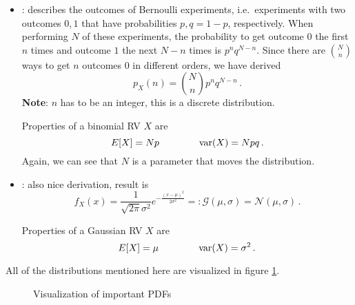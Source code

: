 \begin{ex}
\begin{itemize}
\item {}: describes the outcomes of Bernoulli experiments, i.e.~experiments with two outcomes $0, 1$ that have probabilities $p, q = 1 - p$, respectively. When performing $N$ of these experiments, the probability to get outcome $0$ the first $n$ times and outcome $1$ the next $N - n$ times is $p^n q^{N - n}$. Since there are $\binom{N}{n}$ ways to get $n$ outcomes $0$ in different orders, we have derived
\begin{equation}
p_X(n) = \binom{N}{n} p^n q^{N - n} \, .
\end{equation}
\textbf{Note}: $n$ has to be an integer, this is a discrete distribution.

Properties of a binomial RV $X$ are
\begin{equation}
E[X] = N p \qquad \qquad \operatorname{var}(X) = N p q \, .
\end{equation}
Again, we can see that $N$ is a parameter that moves the distribution.


\item {}: also nice derivation, result is
\begin{equation}
f_X(x) = \frac{1}{\sqrt{2 \pi} \sigma^2} e^{- \frac{(x - \mu)^2}{2 \sigma^2}} =: \mathcal{G}(\mu, \sigma) = \mathcal{N}(\mu, \sigma) \, .
\end{equation}

Properties of a Gaussian RV $X$ are
\begin{equation}
E[X] = \mu \qquad \qquad \operatorname{var}(X) = \sigma^2 \, .
\end{equation}
\end{itemize}

All of the distributions mentioned here are visualized in figure \ref{fig:pdf_plots}.
\end{ex}



\begin{figure}
\centering

%
\hspace{0.04\textwidth}%
%


%
\hspace{0.04\textwidth}%
%




\caption{Visualization of important PDFs}
\label{fig:pdf_plots}
\end{figure}



